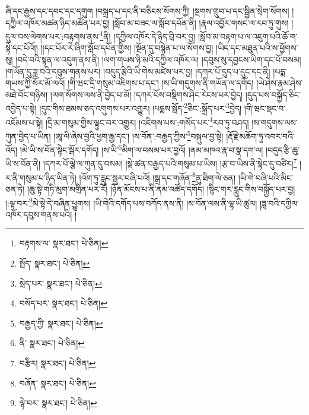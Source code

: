 ཞི་དང་རྒྱས་དང་དབང་དང་དགུག །བསྐྲད་པ་དང་ནི་བཅིངས་སོགས་ཀྱི། །སྔགས་གྲུབ་པ་དང་སྦྱིན་སྲེག་སོགས། །དཀྱིལ་འཁོར་མཚན་ཉིད་མཚོན་པར་བྱ། །སློབ་མ་བཟང་ལ་སློབ་དཔོན་ནི། །རྣལ་འབྱོར་གསང་ལ་རབ་ཏུ་གུས། །དུལ་བས་ལེགས་པར་:བརྟགས་ནས་\footnote{བརྟགས་ལ་  སྣར་ཐང་།  པེ་ཅིན། }ནི། །དཀྱིལ་འཁོར་དེ་ཉིད་བྲི་བར་བྱ། །སློབ་མ་བརྟག་པ་ལ་འཇུག་པའི་ཆོ་ག་སྟེ་དང་པོའོ།། །།དང་པོར་རེ་ཞིག་སློབ་དཔོན་གྱིས། །སྔོན་དུ་བསྙེན་པ་ལ་སོགས་བྱ། །ཡིད་དང་མཐུན་པའི་ས་ཕྱོགས་སུ། །བདེ་བའི་སྟན་ལ་འདུག་ནས་ནི། །ལག་གཡས་ཉི་མའི་དཀྱིལ་འཁོར་ལ། །དབུས་སུ་དབྱངས་ཡིག་དང་པོ་བསམ། །གཡོན་དུ་ཟླ་བའི་དབུས་གནས་པར། །བདུད་རྩིའི་ཡི་གེས་མཛེས་པར་བྱ། །དཀར་པོ་དུད་པ་དུང་དང་ནི། །པདྨ་གཡས་ཀྱི་སོར་མོ་ལའོ། །གི་ཝང་དྲི་གསུམ་འཇིགས་པ་དང་། །ས་ཡི་གདུགས་ནི་གཡོན་ལ་དགོད། །ཡེ་ཤེས་རྣམ་ཤེས་མཐེ་བོང་གཉིས། །ལག་སོགས་ལས་ནི་བྱེད་པ་མོ། །དཀར་པོས་བསྡིགས་ཤིང་རེངས་པར་བྱེད། །དུད་པས་བསྐྱོད་ཅིང་འབྱེད་པ་སྟེ། །དུང་གིས་ཐམས་ཅད་འགུགས་པར་འགྱུར། །པདྨས་སྦོད་\footnote{སྤོད་  སྣར་ཐང་།  པེ་ཅིན། }ཅིང་:སྐྲོད་པར་\footnote{སྲེད་པར་  སྣར་ཐང་།  པེ་ཅིན། }བྱེད། །གི་ཝང་སྡང་བ་འཇོམས་པ་སྟེ། །དྲི་མ་གསུམ་གྱིས་ལྟུང་བར་འགྱུར། །འཇིགས་པས་:གསོད་པར་\footnote{བསོད་པར་  སྣར་ཐང་།  པེ་ཅིན། }རབ་ཏུ་བཤད། །ས་གདུགས་ལས་ཀུན་བྱེད་པ་ཡིན། །ཨཱ་ལི་ཞེས་བྱའི་ཕྱག་རྒྱ་དང་། །ས་བོན་:བརྒྱད་ཀྱིས་\footnote{བརྒྱད་ཀྱི་  སྣར་ཐང་།  པེ་ཅིན། }བསྐུལ་བྱ་སྟེ། །རྡོ་རྗེ་མཆོག་ཏུ་འབར་བའི་འོད། །མེ་ཡི་ས་བོན་སྟེང་སྒོར་དགོད། །ས་ཡི་\footnote{ནི་  སྣར་ཐང་།  པེ་ཅིན། }མིག་ལ་བསམ་པར་བྱའོ། །ནམ་མཁའ་རྣ་བ་སྣ་དག་ལ། །བདུད་རྩི་ཆུ་ཡི་ས་བོན་ནི། །དཀར་པོ་ལྕེ་ལ་ཀུན་དུ་བསམ། །སྡེ་ཚན་བརྒྱད་པའི་གསུམ་པ་ཡིས། །རྩ་བ་ཡིས་ནི་སྟེང་དུ་བཙིར།\footnote{བརྩིར།  སྣར་ཐང་།  པེ་ཅིན། } །ར་ནི་གསུམ་པ་ཉིད་ཡིན་ཏེ། །འོག་ཏུ་རླུང་སྦྱར་བཞི་པའོ། །སྒྲ་དང་གཞོན་\footnote{བཞོན་  སྣར་ཐང་།  པེ་ཅིན། }ནུ་ཐིག་ལེ་ཅན། །ཡི་གེ་བཞི་པའི་མིང་ཅན་ཏེ། །ཆུ་སྟེ་གཏི་མུག་མགྲིན་པར་རོ། །ཉོན་མོངས་པ་ནི་ནམ་འཚོད་དགོད། །སྙིང་གར་རླུང་གིས་བསྐྱོད་པར་བྱ། །:ལྟ་བར་\footnote{ལྟེ་བར་  སྣར་ཐང་།  པེ་ཅིན། }མེ་སྟེ་དེ་བཞིན་ཕྱུགས། །ཡི་གེའི་དགོད་པས་བཀོད་ནས་ནི། །ས་བོན་ལས་ནི་ལྷ་ཡི་ཚུལ། །ཟླ་བའི་དཀྱིལ་འཁོར་དབུས་གནས་པའི། །
